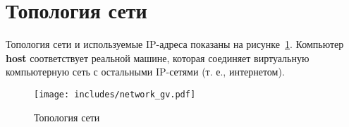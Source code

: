 \documentclass[a4paper,12pt]{article}
\begin{document}
\section*{Топология сети}

Топология сети и используемые IP-адреса показаны на рисунке~\ref{fig:network}.
Компьютер \textbf{host} соответствует реальной машине, которая соединяет виртуальную компьютерную сеть с остальными IP-сетями (т. е., интернетом).

\begin{figure}[!ht]
\centering
\texttt{[image: includes/network\_gv.pdf]}
\caption{Топология сети}
\label{fig:network}
\end{figure}
\end{document}
